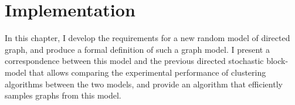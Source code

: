 \newcommand{\asymcloud}[2][.1]{%
\begin{scope}[#2]
\pgftransformscale{#1}%
\pgfpathmoveto{\pgfpoint{261 pt}{115 pt}} 
  \pgfpathcurveto{\pgfqpoint{70 pt}{107 pt}}
                 {\pgfqpoint{137 pt}{291 pt}}
                 {\pgfqpoint{260 pt}{273 pt}} 
  \pgfpathcurveto{\pgfqpoint{78 pt}{382 pt}}
                 {\pgfqpoint{381 pt}{445 pt}}
                 {\pgfqpoint{412 pt}{410 pt}}
  \pgfpathcurveto{\pgfqpoint{577 pt}{587 pt}}
                 {\pgfqpoint{698 pt}{488 pt}}
                 {\pgfqpoint{685 pt}{366 pt}}
  \pgfpathcurveto{\pgfqpoint{840 pt}{192 pt}}
                 {\pgfqpoint{610 pt}{157 pt}}
                 {\pgfqpoint{610 pt}{157 pt}}
  \pgfpathcurveto{\pgfqpoint{531 pt}{39 pt}}
                 {\pgfqpoint{298 pt}{51 pt}}
                 {\pgfqpoint{261 pt}{115 pt}}
\pgfusepath{fill,stroke}         
\end{scope}}    
\newcommand{\asymcloudd}[2][.1]{%
\begin{scope}[#2]
\pgftransformscale{#1}%
\pgfpathmoveto{\pgfpoint{321 pt}{132 pt}} 
  \pgfpathcurveto{\pgfqpoint{90 pt}{111 pt}}
                 {\pgfqpoint{127 pt}{305 pt}}
                 {\pgfqpoint{244 pt}{286 pt}} 
  \pgfpathcurveto{\pgfqpoint{59 pt}{349 pt}}
                 {\pgfqpoint{395 pt}{471 pt}}
                 {\pgfqpoint{401 pt}{423 pt}}
  \pgfpathcurveto{\pgfqpoint{512 pt}{524 pt}}
                 {\pgfqpoint{683 pt}{515 pt}}
                 {\pgfqpoint{675 pt}{376 pt}}
  \pgfpathcurveto{\pgfqpoint{852 pt}{198 pt}}
                 {\pgfqpoint{590 pt}{167 pt}}
                 {\pgfqpoint{590 pt}{147 pt}}
  \pgfpathcurveto{\pgfqpoint{481 pt}{29 pt}}
                 {\pgfqpoint{388 pt}{71 pt}}
                 {\pgfqpoint{321 pt}{132 pt}}
\pgfusepath{fill,stroke}         
\end{scope}}    

\chapter{Implementation}

In this chapter, I develop the requirements for a new random model of directed graph, 
and produce a formal definition of such a 
graph model. I present a correspondence between this model and the previous directed stochastic 
block-model that allows comparing the experimental performance of clustering algorithms between 
the two models, and provide an algorithm that efficiently samples graphs from this model. 

